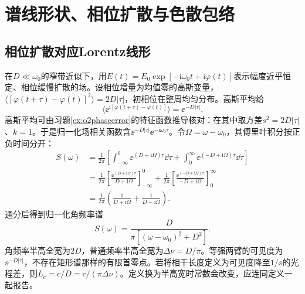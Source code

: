 \section{谱线形状、相位扩散与色散包络}
\subsection{相位扩散对应Lorentz线形}
在$D\ll\omega_0$的窄带近似下，用$E(t)=E_0\exp[-\mathrm i\omega_0t+\mathrm i\varphi(t)]$表示幅度近乎恒定、相位缓慢扩散的场。设相位增量为均值零的高斯变量，$\langle[\varphi(t+\tau)-\varphi(t)]^2\rangle=2D|\tau|$，初相位在整周均匀分布。高斯平均给
\[
 \langle\ee^{\mathrm i[\varphi(t+\tau)-\varphi(t)]}\rangle
 =\ee^{-D|\tau|}.
\]
高斯平均可由习题\ref{ex:o2phaseerror}的特征函数推导核对：在其中取方差$s^2=2D|\tau|$、$k=1$。于是归一化场相关函数含$\ee^{-D|\tau|}\ee^{-\mathrm i\omega_0\tau}$。令$\Omega=\omega-\omega_0$，其傅里叶积分按正负时间分开：
\begin{align*}
 S(\omega)&=\frac1{2\pi}\left[
 \int_{-\infty}^0\ee^{(D+\mathrm i\Omega)\tau}\dd\tau
 +\int_0^\infty\ee^{(-D+\mathrm i\Omega)\tau}\dd\tau\right]\\
 &=\frac1{2\pi}\left[
 \frac{\ee^{(D+\mathrm i\Omega)\tau}}{D+\mathrm i\Omega}\right]_{-\infty}^0
 +\frac1{2\pi}\left[
 \frac{\ee^{(-D+\mathrm i\Omega)\tau}}{-D+\mathrm i\Omega}\right]_0^\infty\\
 &=\frac1{2\pi}\left(\frac1{D+\mathrm i\Omega}
 +\frac1{D-\mathrm i\Omega}\right).
\end{align*}
通分后得到归一化角频率谱
\[
 S(\omega)=\frac{D}{\pi[(\omega-\omega_0)^2+D^2]}.
\]
角频率半高全宽为$2D$，普通频率半高全宽为$\Delta\nu=D/\pi$。等强两臂的可见度为$\ee^{-D|\tau|}$，不存在矩形谱那样的有限首零点。若将相干长度定义为可见度降至$1/\ee$的光程差，则$L_c=c/D=c/(\pi\Delta\nu)$。定义换为半高宽时常数会改变，应连同定义一起报告。

